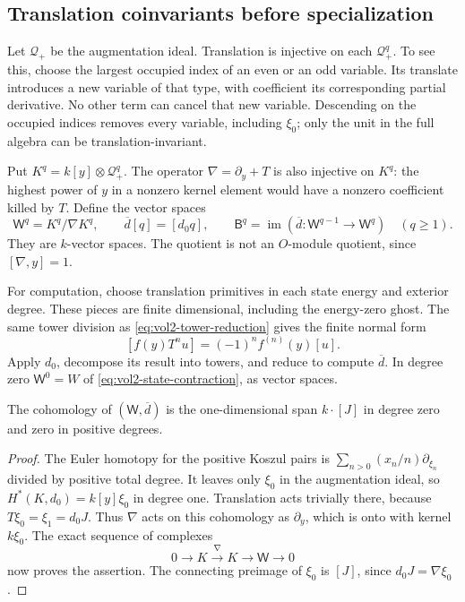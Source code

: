\subsection{Translation coinvariants before specialization}

Let $\mathcal Q_+$ be the augmentation ideal. Translation is
injective on each $\mathcal Q_+^q$. To see this, choose the largest
occupied index of an even or an odd variable. Its translate
introduces a new variable of that type, with coefficient its
corresponding partial derivative. No other term can cancel that
new variable. Descending on the occupied indices removes every
variable, including $\xi_0$; only the unit in the full algebra
can be translation-invariant.

Put $K^q=k[y]\otimes\mathcal Q_+^q$. The operator
$\nabla=\partial_y+T$ is also injective on $K^q$: the highest
power of $y$ in a nonzero kernel element would have a nonzero
coefficient killed by $T$. Define the vector spaces
\begin{equation}\label{eq:vol2-integral-coinvariants}
 \mathsf W^q=K^q/\nabla K^q,\qquad
 \overline d[q]=[d_0q],\qquad
 \mathsf B^q=\operatorname{im}(\overline d:
                   \mathsf W^{q-1}\to\mathsf W^q)\quad(q\geq1).
\end{equation}
They are $k$-vector spaces. The quotient is not an $O$-module
quotient, since $[\nabla,y]=1$.

For computation, choose translation primitives in each state energy
and exterior degree. These pieces are finite dimensional, including
the energy-zero ghost. The same tower division as
\eqref{eq:vol2-tower-reduction} gives the finite normal form
\[
 [f(y)T^nu]=(-1)^nf^{(n)}(y)[u].
\]
Apply $d_0$, decompose its result into towers, and reduce to compute
$\overline d$. In degree zero $\mathsf W^0=W$ of
\eqref{eq:vol2-state-contraction}, as vector spaces.

\begin{lemma}\label{lem:vol2-coinvariant-cohomology}
The cohomology of $(\mathsf W,\overline d)$ is the
one-dimensional span $k\cdot[J]$ in degree zero and zero in
positive degrees.
\end{lemma}
\begin{proof}
The Euler homotopy for the positive Koszul pairs is
$\sum_{n>0}(x_n/n)\partial_{\xi_n}$ divided by positive total
degree. It leaves only $\xi_0$ in the augmentation ideal, so
$H^*(K,d_0)=k[y]\xi_0$ in degree one. Translation acts trivially
there, because $T\xi_0=\xi_1=d_0J$. Thus $\nabla$ acts on this
cohomology as $\partial_y$, which is onto with kernel $k\xi_0$.
The exact sequence of complexes
\[
 0\longrightarrow K\xrightarrow{\nabla}K
       \longrightarrow\mathsf W\longrightarrow0
\]
now proves the assertion. The connecting preimage of $\xi_0$ is
$[J]$, since $d_0J=\nabla\xi_0$.
\end{proof}

